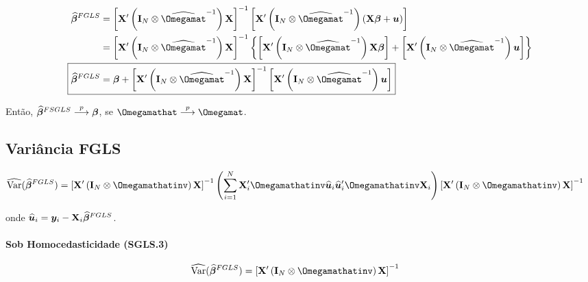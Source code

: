 \documentclass[11pt, oneside, a4paper, article]{article}
\numberwithin{equation}{section}
\begin{document}
\begin{description}
\vspace{-1.5 em}
\begin{align*}
\betavechat^{FGLS} &= 
\left[ \Xmat' \left( \Imat_{N} \otimes \widehat{\Omegamat}^{-1} \right) \Xmat \right]^{-1}
\left[ \Xmat' \left( \Imat_{N} \otimes \widehat{\Omegamat}^{-1} \right) (\Xmat \betavec + \uvec) \right]
\\ &= 
\left[ \Xmat' \left( \Imat_{N} \otimes \widehat{\Omegamat}^{-1} \right) \Xmat \right]^{-1}
\left\{ 
\left[ \Xmat' \left( \Imat_{N} \otimes \widehat{\Omegamat}^{-1} \right) \Xmat \betavec \right] +
\left[ \Xmat' \left( \Imat_{N} \otimes \widehat{\Omegamat}^{-1} \right) \uvec \right]
\right\}
\\
\Aboxed{ \betavechat^{FGLS} &= 
\betavec +
\left[ \Xmat' \left( \Imat_{N} \otimes \widehat{\Omegamat}^{-1} \right) \Xmat \right]^{-1}
\left[ \Xmat' \left( \Imat_{N} \otimes \widehat{\Omegamat}^{-1} \right) \uvec \right] }
\end{align*}

\noindent
Então, 
$\widehat{\boldsymbol{\beta}}^{FSGLS}  \overset{p}{\longrightarrow}  \boldsymbol{\beta}$,
se 
$\Omegamathat \arrowp \Omegamat$.

\subsection{Variância FGLS}

\vspace{-1 em}
\begin{align*}
\Varhat(\betavechat^{FGLS}) &= 
\left[ \Xmat' \left( \Imat_{N} \otimes \Omegamathatinv \right) \Xmat \right]^{-1}
\left( \sum_{i=1}^{N}
\Xmat_{i}' \Omegamathatinv \uvechat_{i} \uvechat_{i}' \Omegamathatinv \Xmat_{i} 
\right)
\left[ \Xmat' \left( \Imat_{N} \otimes \Omegamathatinv \right) \Xmat \right]^{-1}
\end{align*}

\noindent
onde
$\widehat{\boldsymbol{u}}_{i} = \boldsymbol{y}_{i} - \mathbf{X}_{i} \widehat{\boldsymbol{\beta}}^{FGLS}$.

\paragraph{Sob Homocedasticidade (SGLS.3)}

\begin{align*}
\Varhat(\betavechat^{FGLS}) &= 
\left[ \Xmat' \left( \Imat_{N} \otimes \Omegamathatinv \right) \Xmat \right]^{-1}
\end{align*}


\end{description}
\end{document}
